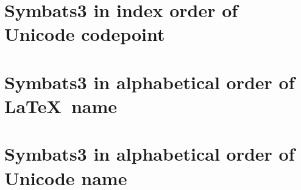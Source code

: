\documentclass{article}
\begin{document}
  \clearpage
\section{Symbats3 in index order of Unicode codepoint}\label{codepoint}

\clearpage
\section{Symbats3 in alphabetical order of \LaTeX\ name}\label{latexname}

\clearpage
\section{Symbats3 in alphabetical order of Unicode name}\label{unicodename}

%
\end{document}
